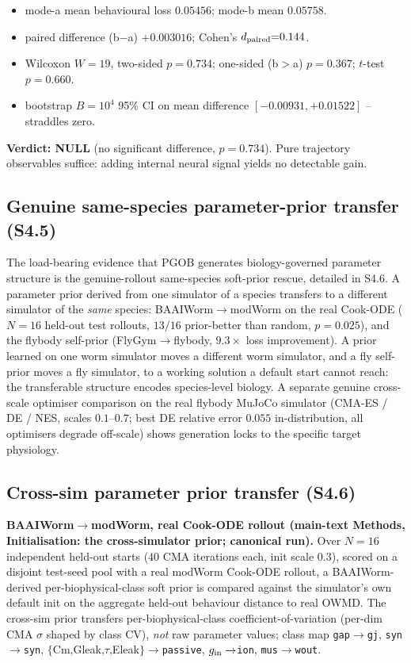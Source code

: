 \documentclass[11pt]{article}
\begin{document}
\begin{itemize}\itemsep0pt
\item mode-a mean behavioural loss $0.05456$; mode-b mean $0.05758$.
\item paired difference (b$-$a) $+0.003016$; Cohen's $d_{\rm paired}{=}0.144$.
\item Wilcoxon $W{=}19$, two-sided $p{=}0.734$; one-sided (b$>$a) $p{=}0.367$; $t$-test $p{=}0.660$.
\item bootstrap $B{=}10^4$ 95\% CI on mean difference $[-0.00931,+0.01522]$ -- straddles zero.
\end{itemize}

\textbf{Verdict: NULL} (no significant difference, $p{=}0.734$). Pure trajectory observables suffice: adding internal neural signal yields no detectable gain.

\subsection{Genuine same-species parameter-prior transfer (S4.5)}
The load-bearing evidence that PGOB generates biology-governed parameter structure is the genuine-rollout same-species soft-prior rescue, detailed in S4.6. A parameter prior derived from one simulator of a species transfers to a different simulator of the \emph{same} species: BAAIWorm$\to$modWorm on the real Cook-ODE ($N{=}16$ held-out test rollouts, $13/16$ prior-better than random, $p{=}0.025$), and the flybody self-prior (FlyGym$\to$flybody, $9.3\times$ loss improvement). A prior learned on one worm simulator moves a different worm simulator, and a fly self-prior moves a fly simulator, to a working solution a default start cannot reach: the transferable structure encodes species-level biology. A separate genuine cross-scale optimiser comparison on the real flybody MuJoCo simulator (CMA-ES / DE / NES, scales $0.1$--$0.7$; best DE relative error $0.055$ in-distribution, all optimisers degrade off-scale) shows generation locks to the specific target physiology.

\subsection{Cross-sim parameter prior transfer (S4.6)}
\textbf{BAAIWorm$\to$modWorm, real Cook-ODE rollout (main-text Methods, Initialisation: the cross-simulator prior; canonical run).} Over $N{=}16$ independent held-out starts ($40$ CMA iterations each, init scale $0.3$), scored on a disjoint test-seed pool with a real modWorm Cook-ODE rollout, a BAAIWorm-derived per-biophysical-class soft prior is compared against the simulator's own default init on the aggregate held-out behaviour distance to real OWMD. The cross-sim prior transfers per-biophysical-class coefficient-of-variation (per-dim CMA $\sigma$ shaped by class CV), \emph{not} raw parameter values; class map \texttt{gap}$\to$\texttt{gj}, \texttt{syn}$\to$\texttt{syn}, $\{$Cm,Gleak,$\tau$,Eleak$\}\to$\texttt{passive}, $g_{\rm in}\to$\texttt{ion}, \texttt{mus}$\to$\texttt{wout}.
\end{document}
